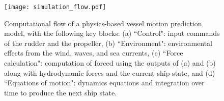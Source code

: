 
\begin{figure}[t]
    \texttt{[image: simulation\_flow.pdf]} 
    \vspace{-8mm}
    \caption{Computational flow of a physics-based vessel motion prediction model, with the following key blocks: (a) ``Control": input commands of the rudder and the propeller, (b) ``Environment": environmental effects from the wind, waves, and sea currents, (c) ``Force calculation": computation of forced using the outputs of (a) and (b) along with hydrodynamic forces and the current ship state, and (d) ``Equations of motion": dynamics equations and integration over time to produce the next ship state.}
    \label{fig:simulation_system}
    \vspace{-3mm}
\end{figure}